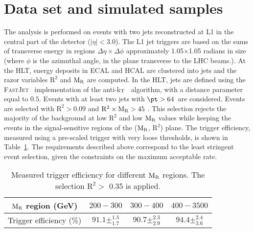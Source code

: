 {{\section{Data set and simulated samples}
\label{sec:sample}
The analysis is performed on events with two jets reconstructed at L1 
in the central part of the detector ($|\eta|< 3.0$). The L1 jet
triggers are based on the sums of %
transverse energy in regions $\Delta\eta\times\Delta\phi$
approximately 1.05$\times$1.05 radians in
size~\cite{Chatrchyan:2008zzk} (where $\phi$ is the azimuthal angle, in the plane transverse to the LHC beams.). 
At the HLT, energy deposits in ECAL and HCAL are clustered into jets and the
razor variables $\mathrm{R^2}$ and $\mathrm{M_{\rm R}}$ are computed. In the
HLT, jets are defined using the {\scshape FastJet}~\cite{fastjet}
implementation of the anti-k$_{\rm{T}}$~\cite{antikt} algorithm, with
a distance parameter equal to $0.5$. Events with at least two jets with $\pt>64$~\GeV are
considered. Events are selected with $\mathrm{R^2}> 0.09$ and
$\mathrm{R^2} \times \mathrm{M_{\rm R}} > 45$ \GeV. This selection rejects
the majority of the background at low $\mathrm{R^2}$ and low
$\mathrm{M_{\rm R}}$ values while keeping the events in the signal-sensitive
regions of the ($\mathrm{M_{\rm R}}$, $\mathrm{R}^2$) plane. 
The trigger efficiency, measured using a pre-scaled trigger with very loose thresholds, is
shown in Table~\ref{tab:Trigger}.  The requirements described above correspond to the least stringent event selection, given the constraints on the maximum acceptable rate.

\begin{table}[htb]
\begin{center}
  \caption{\label{tab:Trigger}Measured trigger efficiency for different
    $\mathrm{M_{\rm R}}$ regions. The selection $\mathrm{R^2} >$ 0.35 is applied.}
\begin{tabular}{|c|c|c|c|} 
  \hline
  $\mathrm{M_{\rm R}}$ region (GeV) & $200-300$ &  $300-400$ &  $400-3500$ \\
  \hline
  Trigger efficiency (\%) & $91.1\pm ^{1.5}_{1.7}$ & $90.7\pm ^{2.3}_{2.9}$ & $94.4 \pm ^{2.4}_{3.6}$ \\
  \hline
\end{tabular}
\end{center}
\end{table}

}}
